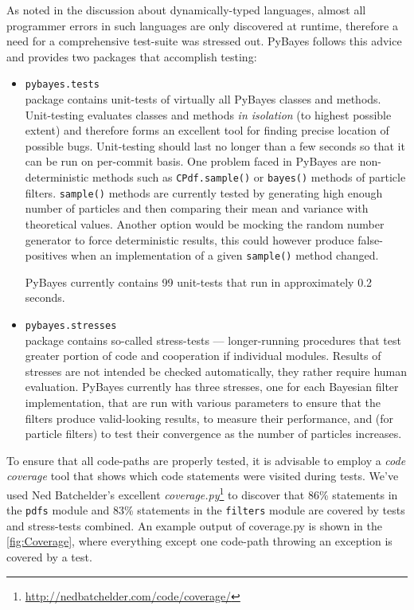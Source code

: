 As noted in the discussion about dynamically-typed languages, almost all programmer errors in such
languages are only discovered at runtime, therefore a need for a comprehensive test-suite was
stressed out. PyBayes follows this advice and provides two packages that accomplish testing:
\begin{itemize}
	\item \verb|pybayes.tests| \\
		package contains unit-tests of virtually all PyBayes classes and methods. Unit-testing
		evaluates classes and methods \emph{in isolation} (to highest possible extent) and therefore
		forms an excellent tool for finding precise location of possible bugs. Unit-testing should
		last no longer than a few seconds so that it can be run on per-commit basis. One problem
		faced in PyBayes are non-deterministic methods such as \verb|CPdf.sample()| or
		\verb|bayes()| methods of particle filters. \verb|sample()| methods are currently tested
		by generating high enough number of particles and then comparing their mean and variance
		with theoretical values.
		Another option would be mocking the random number generator to force deterministic results,
		this could however produce false-positives when an implementation of a given \verb|sample()|
		method changed.

		PyBayes currently contains 99 unit-tests that run in approximately 0.2 seconds.
	\item \verb|pybayes.stresses| \\
		package contains so-called stress-tests --- longer-running procedures that test greater
		portion of code and cooperation if individual modules. Results of stresses are not intended
		be checked automatically, they rather require human evaluation. PyBayes currently has three
		stresses, one for each Bayesian filter implementation, that are run with various parameters
		to ensure that the filters produce valid-looking results, to measure their performance, and
		(for particle filters) to test their convergence as the number of particles increases.
\end{itemize}
To ensure that all code-paths are properly tested, it is advisable to employ a \emph{code coverage}
tool that shows which code statements were visited during tests. We've used Ned Batchelder's excellent
\emph{coverage.py}\footnote{\url{http://nedbatchelder.com/code/coverage/}} to discover that 86\%
statements in the \verb|pdfs| module and 83\% statements in the \verb|filters| module are covered
by tests and stress-tests combined. An example output of coverage.py is shown in the
\autoref{fig:Coverage}, where everything except one code-path throwing an exception is covered by
a test.

